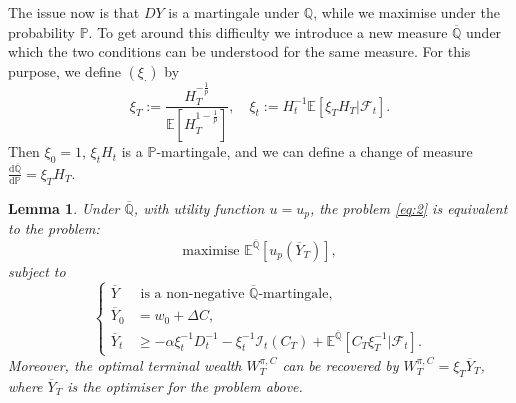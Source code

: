 \documentclass[a4paper]{amsart}
\newtheorem{lemma}[theorem]{Lemma}
\theoremstyle{definition}
\theoremstyle{remark}
\numberwithin{equation}{section}
\newcommand{\E}{\mathbb{E}}
\renewcommand{\P}{\mathbb{P}}
\newcommand{\Q}{\mathbb{Q}}
\newcommand{\di}{\mathrm{d}}
\newcommand{\Fc}{\mathcal{F}}
\newcommand{\Ep}[1]{\E\left[#1\right]}
\newcommand{\Ebq}[1]{\E^{\bQ}\left[#1\right]}
\newcommand{\ol}{\overline}
\newcommand{\In}{\mathcal{I}} %
\newcommand{\bQ}{\ol{\mathbb{Q}}}
\begin{document}
The issue now is that $DY$ is a martingale under $\Q$, while we maximise under the probability $\P$. To get around this difficulty we introduce a new measure $\bQ$ under which the two conditions can be understood for the same measure. For this purpose, we define $(\xi_{\cdot})$ by
\begin{equation}
  \label{eq:4}
  \xi_T := \frac{H_T^{-\frac{1}{p}}}{\Ep{H_T^{1-\frac{1}{p}}}}, \quad \xi_t := H_t^{-1} \Ep{\xi_T H_T | \Fc_t}.
\end{equation}
Then $\xi_0 = 1$,  $\xi_t H_t$ is a $\P$-martingale, and we can define a change of measure $\frac{\di \bQ}{\di \P} = \xi_T H_T$.

\begin{lemma} \label{lem:Ybar}
  Under $\bQ$, with utility function $u = u_p$, the problem \eqref{eq:2} is equivalent to the problem:
  $$
   \text{maximise } \Ebq{u_p(\ol{Y}_T)},
  $$
  subject to
  \begin{equation}\label{eq:5}
  \begin{cases}
    \ol{Y} &\text{ is a non-negative $\bQ$-martingale}, \\
     \ol{Y}_0 &=  w_0 + \Delta C,\\%
     \ol{Y}_t &\ge  -\alpha \xi_t^{-1} D_t^{-1} -\xi_t^{-1} \In_t(C_T)  + \Ebq{C_T \xi_T^{-1}| \Fc_t}.
    \end{cases}
  \end{equation}
Moreover, the optimal terminal wealth $W_T^{\pi,C}$ can be recovered by $W_T^{\pi,C} = \xi_T \ol{Y}_T$, where $\ol{Y}_T$ is the optimiser for the problem above.
\end{lemma}
\end{document}
